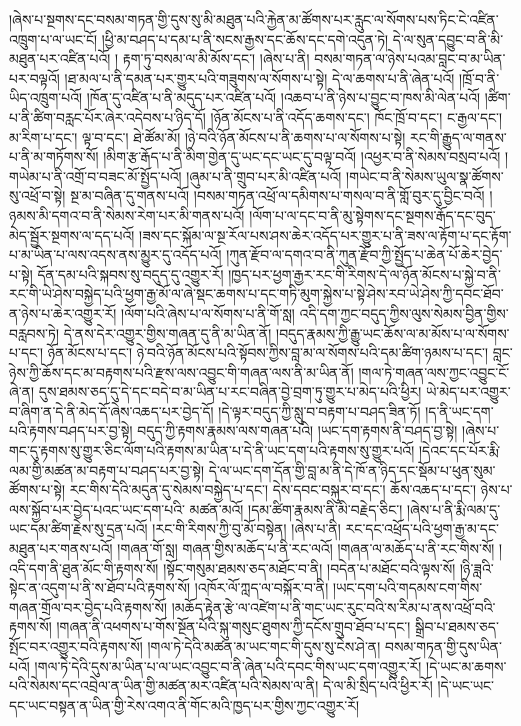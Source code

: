།ཞེས་པ་སྔགས་དང་བསམ་གཏན་གྱི་དུས་སུ་མི་མཐུན་པའི་རྐྱེན་མ་ཚོགས་པར་རླུང་ལ་སོགས་པས་ཏིང་ངེ་འཛིན་འཁྲུག་པ་ལ་ཡང་ངོ། །ཕྱི་མ་བཤད་པ་དམ་པ་ནི་སངས་རྒྱས་དང་ཆོས་དང་དགེ་འདུན་ཏེ། དེ་ལ་སུན་དབྱུང་བ་ནི་མི་མཐུན་པར་འཛིན་པའོ། །
རྟག་ཏུ་བསམ་ལ་མི་མོས་དང་། །ཞེས་པ་ནི། བསམ་གཏན་ལ་ཉེས་པའམ་བླང་བ་མ་ཡིན་པར་བལྟའོ། །ཐ་མལ་པ་ནི་དམན་པར་གྱུར་པའི་གཟུགས་ལ་སོགས་པ་སྟེ། དེ་ལ་ཆགས་པ་ནི་ཞེན་པའོ། །ཁྲོ་བ་ནི་ཡིད་འཁྲུག་པའོ། །ཁོན་དུ་འཛིན་པ་ནི་མདུད་པར་འཛིན་པའོ། །འཆབ་པ་ནི་ཉེས་པ་བྱུང་བ་ཁས་མི་ལེན་པའོ། །ཚིག་པ་ནི་ཚིག་བརླང་པོར་ཞེར་འདེབས་པ་ཉིད་དོ། །ཉོན་མོངས་པ་ནི་འདོད་ཆགས་དང་། ཁོང་ཁྲོ་བ་དང་། ང་རྒྱལ་དང་། མ་རིག་པ་དང་། ལྟ་བ་དང་། ཐེ་ཚོམ་མོ། །ཉེ་བའི་ཉོན་མོངས་པ་ནི་ཆགས་པ་ལ་སོགས་པ་སྟེ། རང་གི་རྒྱུད་ལ་གནས་པ་ནི་མ་གཏོགས་སོ། །མིག་རྩ་རྒོད་པ་ནི་མིག་གྱེན་དུ་ཡང་དང་ཡང་དུ་བལྟ་བའོ། །འཕྱར་བ་ནི་སེམས་བསྲབ་པའོ། །གཡེམ་པ་ནི་འགྲོ་བ་བཟང་མོ་སྤྱོད་པའོ། །ཞུམ་པ་ནི་གྲུབ་པར་མི་འཛིན་པའོ། །གཡེང་བ་ནི་སེམས་ཡུལ་སྣ་ཚོགས་​ སུ་འཕྲོ་བ་སྟེ། སྔ་མ་བཞིན་དུ་གནས་པའོ། །བསམ་གཏན་འཕྲོ་ལ་དམིགས་པ་གསལ་བ་ནི་གློ་བུར་དུ་བྱིང་བའོ། །ཉམས་མི་དགའ་བ་ནི་སེམས་རེག་པར་མི་གནས་པའོ། །ལོག་པ་ལ་དང་བ་ནི་མུ་སྟེགས་དང་སྔགས་རྒོད་དང་བུད་མེད་སྦྱོར་སྔགས་ལ་དད་པའོ། །ཟས་དང་སྐོམ་ལ་སྔ་རོལ་པས་ཤས་ཆེར་འདོད་པར་གྱུར་པ་ནི་ཟས་ལ་རྟོག་པ་དང་རྟོག་པ་མ་ཡིན་པ་ལས་འདས་ནས་མྱུར་དུ་འདོད་པའོ། །ཀུན་རྫོབ་ལ་དགའ་བ་ནི་ཀུན་རྫོབ་ཀྱི་སྤྱོད་པ་ཆེན་པོ་ཆེར་བྱེད་པ་སྟེ། དོན་དམ་པའི་སྐབས་སུ་བདུད་དུ་འགྱུར་རོ། །ཁྱད་པར་ཕྱག་རྒྱར་རང་གི་རིགས་དེ་ལ་ཉོན་མོངས་པ་སྐྱེ་བ་ནི་རང་གི་ཡེ་ཤེས་བསྐྱེད་པའི་ཕྱག་རྒྱ་མོ་ལ་ཞེ་སྡང་ཆགས་པ་དང་གཏི་མུག་སྐྱེས་པ་སྟེ་ཤེས་རབ་ཡེ་ཤེས་ཀྱི་དབང་ཐོབ་ན་ཉེས་པ་ཆེར་འགྱུར་རོ། །ལོག་པའི་ཞེས་པ་ལ་སོགས་པ་ནི་གོ་སླ། འདི་དག་ཀྱང་བདུད་ཀྱིས་ལུས་སེམས་བྱིན་གྱིས་བརླབས་ཏེ། དེ་ནས་དེར་འགྱུར་གྱིས་གཞན་དུ་ནི་མ་ཡིན་ནོ། །བདུད་རྣམས་ཀྱི་རྒྱུ་ཡང་ཆོས་ལ་མ་མོས་པ་ལ་སོགས་པ་དང་། ཉོན་མོངས་པ་དང་། ཉེ་བའི་ཉོན་མོངས་པའི་སྟོབས་ཀྱིས་བླ་མ་ལ་སོགས་པའི་དམ་ཚིག་ཉམས་པ་དང་། བླང་ཉེས་ཀྱི་ཆོས་དང་མ་བརྟགས་པའི་རྫས་ལས་འབྱུང་གི་གཞན་ལས་ནི་མ་ཡིན་ནོ། །གལ་ཏེ་གཞན་ལས་ཀྱང་འབྱུང་ངོ་ཞེ་ན། དུས་ཐམས་ཅད་དུ་དེ་དང་བདེ་བ་མ་ཡིན་པ་རང་བཞིན་བྱེ་བྲག་ཏུ་གྱུར་པ་མེད་པའི་ཕྱིར། ཡེ་མེད་པར་འགྱུར་བ་ཞིག་ན་དེ་ནི་མེད་དོ་ཞེས་འཆད་པར་བྱེད་དོ། །དེ་ལྟར་བདུད་ཀྱི་སླུ་བ་བརྟག་པ་བཤད་ཟིན་ཏོ། །ད་ནི་ཡང་དག་པའི་རྟགས་བཤད་པར་བྱ་སྟེ། བདུད་ཀྱི་རྟགས་རྣམས་ལས་གཞན་པའི། །ཡང་དག་རྟགས་ནི་བཤད་བྱ་སྟེ། །ཞེས་པ་གང་དུ་རྟགས་སུ་གྱུར་ཅིང་ལོག་པའི་རྟགས་མ་ཡིན་པ་དེ་ནི་ཡང་དག་པའི་རྟགས་སུ་གྱུར་པའོ། །དེའང་དང་པོར་རྨི་ལམ་གྱི་མཚན་མ་བརྟག་པ་བཤད་པར་བྱ་སྟེ། དེ་ལ་ཡང་དག་དོན་གྱི་བླ་མ་ནི་དེ་ཁོ་ན་ཉིད་དང་སྡོམ་པ་ཕུན་སུམ་ཚོགས་པ་སྟེ། རང་གིས་དེའི་མདུན་དུ་སེམས་བསྐྱེད་པ་དང་། དེས་དབང་བསྐུར་བ་དང་། ཆོས་འཆད་པ་དང་། ཉེས་པ་ལས་སྐྱོབ་པར་བྱེད་པའང་ཡང་དག་པའི་​ མཚན་མའོ། །དམ་ཚིག་རྣམས་ནི་མི་བརྗེད་ཅིང་། །ཞེས་པ་ནི་རྨི་ལམ་དུ་ཡང་དམ་ཚིག་རྗེས་སུ་དྲན་པའོ། །རང་གི་རིགས་ཀྱི་བུ་མོ་བསྟེན། །ཞེས་པ་ནི། རང་དང་འཕྲོད་པའི་ཕྱག་རྒྱ་མ་དང་མཐུན་པར་གནས་པའོ། །གཞན་གོ་སླ། གཞན་གྱིས་མཆོད་པ་ནི་རང་ལའོ། །གཞན་ལ་མཆོད་པ་ནི་རང་གིས་སོ། །འདི་དག་ནི་ཐུན་མོང་གི་རྟགས་སོ། །སྟོང་གསུམ་ཐམས་ཅད་མཐོང་བ་ནི། །བདེན་པ་མཐོང་བའི་ལྟས་སོ། །ཉི་ཟླའི་སྟེང་ན་འདུག་པ་ནི་ས་ཐོབ་པའི་རྟགས་སོ། །འཁོར་ལོ་ཀླད་ལ་བསྐོར་བ་ནི། །ཡང་དག་པའི་གདམས་ངག་གིས་གཞན་གྲོལ་བར་བྱེད་པའི་རྟགས་སོ། །མཆོད་རྟེན་རྩེ་ལ་འཛེག་པ་ནི་གང་ཡང་རུང་བའི་ས་རིམ་པ་ནས་འཕྲོ་བའི་རྟགས་སོ། །གཞན་ནི་འཕགས་པ་གོས་སྔོན་པོའི་སྐུ་གསུང་ཐུགས་ཀྱི་དངོས་གྲུབ་ཐོབ་པ་དང་། སྒྲིབ་པ་ཐམས་ཅད་སྤོང་བར་འགྱུར་བའི་རྟགས་སོ། །གལ་ཏེ་དེའི་མཚན་མ་ཡང་གང་གི་དུས་སུ་ངེས་ཤེ་ན། བསམ་གཏན་གྱི་དུས་ཡིན་པའོ། །གལ་ཏེ་དེའི་དུས་མ་ཡིན་པ་ལ་ཡང་འབྱུང་བ་ནི་ཞེན་པའི་དབང་གིས་ཡང་དག་འགྱུར་རོ། །དེ་ཡང་མ་ཆགས་པའི་སེམས་དང་འབྲེལ་ན་ཡིན་གྱི་མཚན་མར་འཛིན་པའི་སེམས་ལ་ནི། དེ་ལ་མི་སྲིད་པའི་ཕྱིར་རོ། །དེ་ཡང་ཡང་དང་ཡང་བསྟན་ན་ཡིན་གྱི་རེས་འགའ་ནི་གོང་མའི་ཁྱད་པར་གྱིས་ཀྱང་འགྱུར་རོ། 